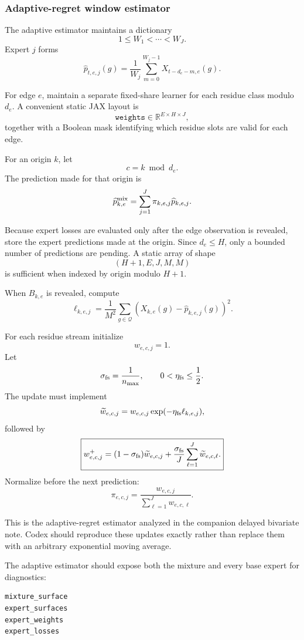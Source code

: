 \documentclass[11pt]{article}
\newcommand{\R}{\mathbb{R}}
\begin{document}
\subsubsection{Adaptive-regret window estimator}

The adaptive estimator maintains a dictionary
\[
    1\le W_1<\cdots<W_J.
\]
Expert $j$ forms
\[
    \widehat p_{t,e,j}(g)
    =
    \frac1{W_j}
    \sum_{m=0}^{W_j-1}
    X_{t-d_e-m,e}(g).
\]

For edge $e$, maintain a separate fixed-share learner for each residue class
modulo $d_e$.  A convenient static JAX layout is
\[
    \texttt{weights}
    \in
    \R^{E\times H\times J},
\]
together with a Boolean mask identifying which residue slots are valid for
each edge.

For an origin $k$, let
\[
    c=k\bmod d_e.
\]
The prediction made for that origin is
\[
    \widehat p^{\rm mix}_{k,e}
    =
    \sum_{j=1}^{J}
    \pi_{k,e,j}
    \widehat p_{k,e,j}.
\]

Because expert losses are evaluated only after the edge observation is
revealed, store the expert predictions made at the origin.  Since
$d_e\le H$, only a bounded number of predictions are pending.  A static array
of shape
\[
    (H+1,E,J,M,M)
\]
is sufficient when indexed by origin modulo $H+1$.

When $B_{k,e}$ is revealed, compute
\[
    \ell_{k,e,j}
    =
    \frac1{M^2}
    \sum_{g\in\mathcal Q}
    \left(
        X_{k,e}(g)
        -
        \widehat p_{k,e,j}(g)
    \right)^2.
\]

For each residue stream initialize
\[
    w_{e,c,j}=1.
\]
Let
\[
    \sigma_{\rm fs}
    =
    \frac1{n_{\max}},
    \qquad
    0<\eta_{\rm fs}\le\frac12.
\]
The update must implement
\[
    \widetilde w_{e,c,j}
    =
    w_{e,c,j}
    \exp(
        -\eta_{\rm fs}\ell_{k,e,j}
    ),
\]
followed by
\[
\boxed{
    w^+_{e,c,j}
    =
    (1-\sigma_{\rm fs})
    \widetilde w_{e,c,j}
    +
    \frac{\sigma_{\rm fs}}{J}
    \sum_{\ell=1}^{J}
    \widetilde w_{e,c,\ell}.
}
\]
Normalize before the next prediction:
\[
    \pi_{e,c,j}
    =
    \frac{
        w_{e,c,j}
    }{
        \sum_{\ell=1}^{J}w_{e,c,\ell}
    }.
\]

This is the adaptive-regret estimator analyzed in the companion delayed
bivariate note.  Codex should reproduce these updates exactly rather than
replace them with an arbitrary exponential moving average.

The adaptive estimator should expose both the mixture and every base expert
for diagnostics:
\begin{verbatim}
mixture_surface
expert_surfaces
expert_weights
expert_losses
\end{verbatim}
\end{document}
